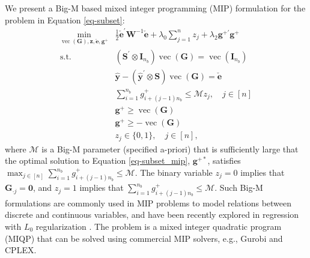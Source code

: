 \documentclass[
  11pt]{article}
\begin{document}
We present a Big-M based mixed integer programming (MIP) formulation for
the problem in Equation \ref{eq-subset}:
\begin{align} \label{eq-subset_mip}
\min_{\operatorname{vec}(\bm{G}), \bm{z}, \check{\bm{e}}, \bm{g}^{+}} & \frac{1}{2}\check{\bm{e}}^{\prime} \bm{W}^{-1}\check{\bm{e}} + \lambda_0 \sum_{j=1}^n z_j + \lambda_2 \bm{g}^{+\prime}\bm{g}^{+} \\
\text{s.t.} \quad & \left(\bm{S}^{\prime} \otimes \bm{I}_{n_b}\right) \operatorname{vec}(\bm{G})=\operatorname{vec}\left(\bm{I}_{n_b}\right)\nonumber \\
& \hat{\bm{y}}-\left(\hat{\bm{y}}^{\prime} \otimes \bm{S}\right)\operatorname{vec}(\bm{G}) = \check{\bm{e}} \nonumber\\
& \sum_{i=1}^{n_b} g_{i + (j-1) n_b}^{+} \leqslant \mathcal{M} z_j, \quad j \in[n] \nonumber\\
& \bm{g}^{+} \geqslant \operatorname{vec}(\bm{G}) \nonumber\\
& \bm{g}^{+} \geqslant-\operatorname{vec}(\bm{G}) \nonumber\\
& z_j \in\{0,1\}, \quad j \in[n], \nonumber
\end{align} where \(\mathcal{M}\) is a Big-M parameter (specified
a-priori) that is sufficiently large that the optimal solution to
Equation \ref{eq-subset_mip}, \(\bm{g}^{+*}\), satisfies
\(\max_{j \in [n]}\sum_{i=1}^{n_b} g_{i + (j-1) n_b}^{+} \leqslant \mathcal{M}\).
The binary variable \(z_j=0\) implies that \(\bm{G}_{\cdot j}=\bm{0}\),
and \(z_j=1\) implies that
\(\sum_{i=1}^{n_b} g_{i + (j-1) n_b}^{+} \leqslant \mathcal{M}\). Such
Big-M formulations are commonly used in MIP problems to model relations
between discrete and continuous variables, and have been recently
explored in regression with \(L_0\) regularization
\citep{Bertsimas2016-ig}. The problem is a mixed integer quadratic
program (MIQP) that can be solved using commercial MIP solvers, e.g.,
Gurobi and CPLEX.
\end{document}

